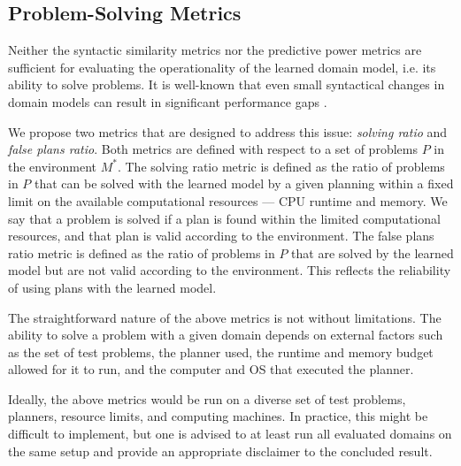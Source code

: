 \documentclass{article}
\theoremstyle{definition}
\theoremstyle{remark}
\newcommand{\realm}{{\ensuremath{M^*}}\xspace}
\newif\ifaddcomments
\newcommand{\roni}[1]{\ifaddcomments{\textcolor{red}{[Roni: #1]}}\fi}
\newcommand{\mauro}[1]{\ifaddcomments{\textcolor{green}{[Mauro: #1]}}\fi}
\newcommand{\gregor}[1]{\ifaddcomments{\textcolor{orange}{[Gregor: #1]}}\fi}
\begin{document}
\gregor{I wanted to add one more point that I got from Pascal Bercher:\\
If we view domain model learning as an algorithmic problem, we are supposed to only judge the output of the learner based on the inferences that can be drawn explicit from the given trajectories.
If we do anything else we implicitly evaluate the bias of the learners towards the type domain models we ``usually'' have in the input domains.
}

 
\subsection{Problem-Solving Metrics}
Neither the syntactic similarity metrics nor the predictive power metrics are sufficient for evaluating the operationality \citep{DBLP:conf/kcap/McCluskeyVV17} of the learned domain model, i.e. its ability to solve problems. It is well-known that even small syntactical changes in domain models can result in significant performance gaps \citep{DBLP:conf/kcap/VallatiC19,vallati2021importance}.

We propose two metrics that are designed to address this issue: \emph{solving ratio} and \emph{false plans ratio}. 
Both metrics are defined with respect to a set of problems $P$ in the environment $\realm$. 
The solving ratio metric is defined as the ratio of problems in $P$ that can be solved with the learned model by a given planning within a fixed limit on the available computational resources --- CPU runtime and memory.
We say that a problem is solved if a plan is found within the limited computational resources, and that plan is valid according to the environment. 
The false plans ratio metric is defined as the ratio of problems in $P$ that are solved by the learned model but are not valid according to the environment. This reflects the reliability of using plans with the learned model.

The straightforward nature of the above metrics is not without limitations. The ability to solve a problem with a given domain depends on external factors such as the set of test problems, the planner used, the runtime and memory budget allowed for it to run, and the computer and OS that executed the planner.
\gregor{Theorem provers and proof assistants, e.g., Lean, sometimes use ``heartbearts'' (\url{https://florisvandoorn.com/carleson/docs/Lean/Util/Heartbeats.html}) instead of time. They measure elementary orations and bound their number. This ensures reproducibility across different machines. For us this could e.g.\ be number of expanded states. Or the number of times an effect is applied -- this would also include computation effort for heuristics.}
Ideally, the above metrics would be run on a diverse set of test problems, planners, resource limits, and computing machines. In practice, this might be difficult to implement, but one is advised to at least run all evaluated domains on the same setup and provide an appropriate disclaimer to the concluded result. 
\end{document}
